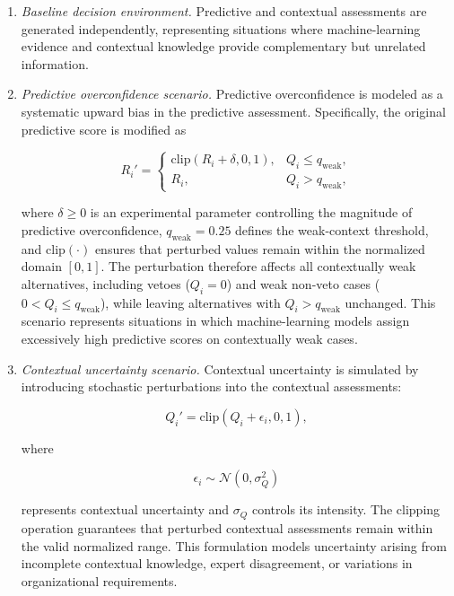 \documentclass[mathematics,article,submit,moreauthors]{Definitions/mdpi}
\begin{document}
\begin{enumerate}

\item \textit{Baseline decision environment.}
Predictive and contextual assessments are generated independently,
representing situations where machine-learning evidence and contextual
knowledge provide complementary but unrelated information.

\item \textit{Predictive overconfidence scenario.}
Predictive overconfidence is modeled as a systematic upward bias in the
predictive assessment. Specifically, the original predictive score is
modified as

\begin{equation}
R_i'=
\begin{cases}
\mathrm{clip}(R_i+\delta,0,1), & Q_i\le q_{\mathrm{weak}},\\[4pt]
R_i, & Q_i> q_{\mathrm{weak}},
\end{cases}
\label{eq:overconfidence}
\end{equation}

where $\delta\ge0$ is an experimental parameter controlling the magnitude of
predictive overconfidence, $q_{\mathrm{weak}}=0.25$ defines the
weak-context threshold, and $\mathrm{clip}(\cdot)$ ensures that perturbed
values remain within the normalized domain $[0,1]$. The perturbation
therefore affects all contextually weak alternatives, including vetoes
($Q_i=0$) and weak non-veto cases ($0<Q_i\le q_{\mathrm{weak}}$), while
leaving alternatives with $Q_i>q_{\mathrm{weak}}$ unchanged. This
scenario represents situations in which machine-learning models assign
excessively high predictive scores on contextually weak cases.

\item \textit{Contextual uncertainty scenario.}
Contextual uncertainty is simulated by introducing stochastic
perturbations into the contextual assessments:

\begin{equation}
Q_i'=\mathrm{clip}(Q_i+\epsilon_i,0,1),
\end{equation}

where

\begin{equation}
\epsilon_i\sim\mathcal{N}(0,\sigma_Q^2)
\end{equation}

represents contextual uncertainty and $\sigma_Q$ controls its intensity.
The clipping operation guarantees that perturbed contextual assessments
remain within the valid normalized range. This formulation models
uncertainty arising from incomplete contextual knowledge, expert
disagreement, or variations in organizational requirements.


\end{enumerate}
\end{document}

